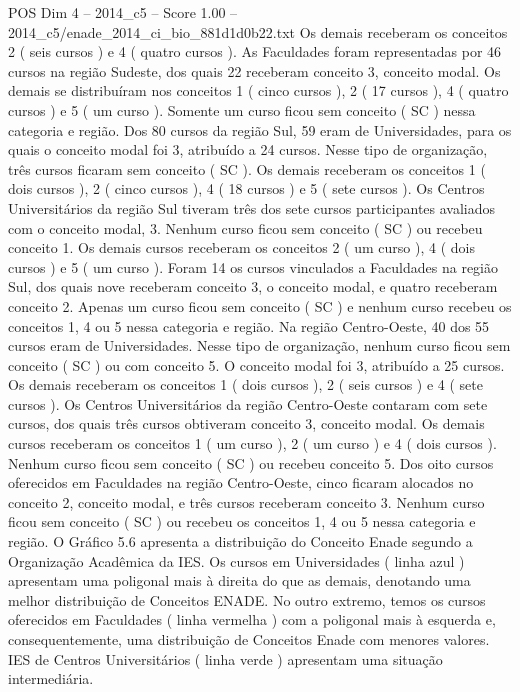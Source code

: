 \begin{textsample}{POS Dim 4 – 2014\_c5 – Score 1.00 – 2014\_c5/enade\_2014\_ci\_bio\_881d1d0b22.txt}
Os demais receberam os conceitos 2 ( seis cursos ) e 4 ( quatro cursos ).
As Faculdades foram representadas por 46 cursos na região Sudeste, dos quais 22 receberam conceito 3, conceito modal.
Os demais se distribuíram nos conceitos 1 ( cinco cursos ), 2 ( 17 cursos ), 4 ( quatro cursos ) e 5 ( um curso ).
Somente um curso ficou sem conceito ( SC ) nessa categoria e região.
Dos 80 cursos da região Sul, 59 eram de Universidades, para os quais o conceito modal foi 3, atribuído a 24 cursos.
Nesse tipo de organização, três cursos ficaram sem conceito ( SC ).
Os demais receberam os conceitos 1 ( dois cursos ), 2 ( cinco cursos ), 4 ( 18 cursos ) e 5 ( sete cursos ).
Os Centros Universitários da região Sul tiveram três dos sete cursos participantes avaliados com o conceito modal, 3.
Nenhum curso ficou sem conceito ( SC ) ou recebeu conceito 1.
Os demais cursos receberam os conceitos 2 ( um curso ), 4 ( dois cursos ) e 5 ( um curso ).
Foram 14 os cursos vinculados a Faculdades na região Sul, dos quais nove receberam conceito 3, o conceito modal, e quatro receberam conceito 2.
Apenas um curso ficou sem conceito ( SC ) e nenhum curso recebeu os conceitos 1, 4 ou 5 nessa categoria e região.
Na região Centro-Oeste, 40 dos 55 cursos eram de Universidades.
Nesse tipo de organização, nenhum curso ficou sem conceito ( SC ) ou com conceito 5.
O conceito modal foi 3, atribuído a 25 cursos.
Os demais receberam os conceitos 1 ( dois cursos ), 2 ( seis cursos ) e 4 ( sete cursos ).
Os Centros Universitários da região Centro-Oeste contaram com sete cursos, dos quais três cursos obtiveram conceito 3, conceito modal.
Os demais cursos receberam os conceitos 1 ( um curso ), 2 ( um curso ) e 4 ( dois cursos ).
Nenhum curso ficou sem conceito ( SC ) ou recebeu conceito 5.
Dos oito cursos oferecidos em Faculdades na região Centro-Oeste, cinco ficaram alocados no conceito 2, conceito modal, e três cursos receberam conceito 3.
Nenhum curso ficou sem conceito ( SC ) ou recebeu os conceitos 1, 4 ou 5 nessa categoria e região.
O Gráfico 5.6 apresenta a distribuição do Conceito Enade segundo a Organização Acadêmica da IES.
Os cursos em Universidades ( linha azul ) apresentam uma poligonal mais à direita do que as demais, denotando uma melhor distribuição de Conceitos ENADE.
No outro extremo, temos os cursos oferecidos em Faculdades ( linha vermelha ) com a poligonal mais à esquerda e, consequentemente, uma distribuição de Conceitos Enade com menores valores.
IES de Centros Universitários ( linha verde ) apresentam uma situação intermediária.

\end{textsample}
